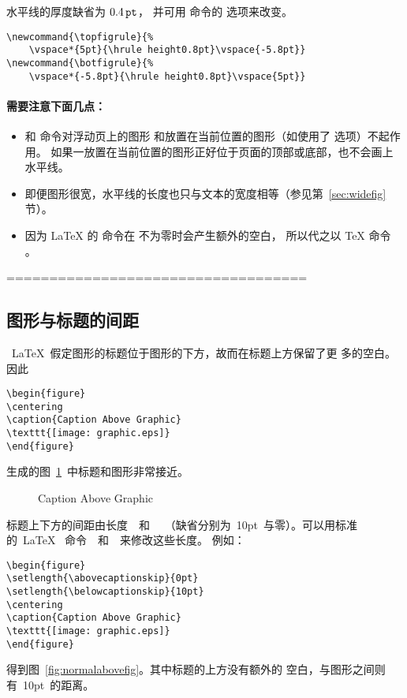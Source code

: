 水平线的厚度缺省为 $0.4\,\mathtt{pt}$，
并可用  命令的  选项来改变。
\begin{lstlisting}
\newcommand{\topfigrule}{% 
	\vspace*{5pt}{\hrule height0.8pt}\vspace{-5.8pt}} 
\newcommand{\botfigrule}{% 
	\vspace*{-5.8pt}{\hrule height0.8pt}\vspace{5pt}}
\end{lstlisting}

\paragraph{需要注意下面几点：}
\begin{itemize}
	\item {} 和  命令对浮动页上的图形
	和放置在当前位置的图形（如使用了 选项）不起作用。
	如果一放置在当前位置的图形正好位于页面的顶部或底部，也不会画上水平线。
	\item 即便图形很宽，水平线的长度也只与文本的宽度相等（参见第~\ref{sec:widefig} 节）。
	\item 因为 \LaTeX{} 的 命令在  不为零时会产生额外的空白，
	所以代之以 \TeX{} 命令 。
\end{itemize}

===================================
\subsection{图形与标题的间距}\label{ssec:capspace}

~\LaTeX{}~假定图形的标题位于图形的下方，故而在标题上方保留了更
多的空白。因此
\begin{Verbatim}[xleftmargin=1cm]
\begin{figure} 
\centering 
\caption{Caption Above Graphic} 
\texttt{[image: graphic.eps]} 
\end{figure}
\end{Verbatim}
生成的图~\ref{fig:verynearcap}~中标题和图形非常接近。

\begin{figure} 
	\centering 
	\caption{Caption Above Graphic}\label{fig:verynearcap}
	\resizebox{2in}{!}{\usebox{\graphic}}
\end{figure}

标题上下方的间距由长度~~和
~~（缺省分别为~10pt~与零）。可以用标准的~\LaTeX{}~
命令~~和~~来修改这些长度。
例如：
\begin{Verbatim}[xleftmargin=1cm]
\begin{figure} 
\setlength{\abovecaptionskip}{0pt} 
\setlength{\belowcaptionskip}{10pt} 
\centering 
\caption{Caption Above Graphic} 
\texttt{[image: graphic.eps]} 
\end{figure}
\end{Verbatim}
得到图~\ref{fig:normalabovefig}。其中标题的上方没有额外的
空白，与图形之间则有~10pt~的距离。

